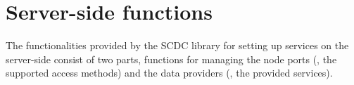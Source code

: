 \chapter{Server-side functions}
\label{chap:server}

The functionalities provided by the SCDC library for setting up services on the server-side consist of two parts, functions for managing the node ports (\ie, the supported access methods) and the data providers (\ie, the provided services).



